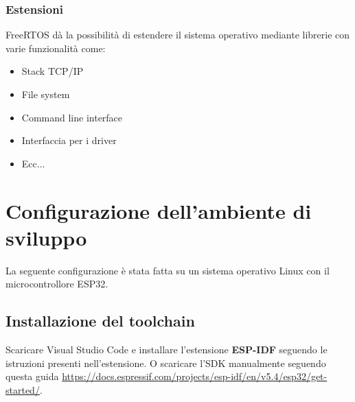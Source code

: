 \documentclass[a4paper]{article}
\begin{document}
\subsubsection{Estensioni}
FreeRTOS dà la possibilità di estendere il sistema operativo mediante librerie con
varie funzionalità come:
\begin{itemize}
  \item Stack TCP/IP
  \item File system
  \item Command line interface
  \item Interfaccia per i driver
  \item Ecc...
\end{itemize}

\section{Configurazione dell'ambiente di sviluppo}
La seguente configurazione è stata fatta su un sistema operativo Linux con il 
microcontrollore ESP32.

\subsection{Installazione del toolchain}
Scaricare Visual Studio Code e installare l'estensione \textbf{ESP-IDF} seguendo
le istruzioni presenti nell'estensione. O scaricare l'SDK manualmente seguendo
questa guida \url{https://docs.espressif.com/projects/esp-idf/en/v5.4/esp32/get-started/}.
\end{document}
